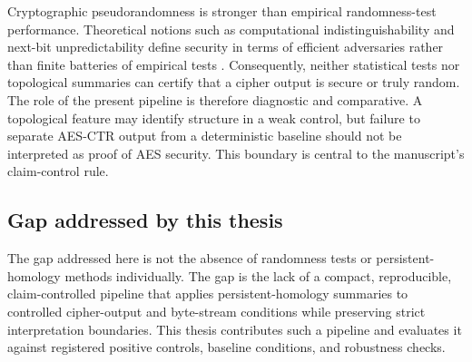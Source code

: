 Cryptographic pseudorandomness is stronger than empirical randomness-test performance. Theoretical notions such as computational indistinguishability and next-bit unpredictability define security in terms of efficient adversaries rather than finite batteries of empirical tests \citep{yao1982theory}. Consequently, neither statistical tests nor topological summaries can certify that a cipher output is secure or truly random. The role of the present pipeline is therefore diagnostic and comparative. A topological feature may identify structure in a weak control, but failure to separate AES-CTR output from a deterministic baseline should not be interpreted as proof of AES security. This boundary is central to the manuscript's claim-control rule.

\subsection{Gap addressed by this thesis}
\label{subsec:related-gap}

The gap addressed here is not the absence of randomness tests or persistent-homology methods individually. The gap is the lack of a compact, reproducible, claim-controlled pipeline that applies persistent-homology summaries to controlled cipher-output and byte-stream conditions while preserving strict interpretation boundaries. This thesis contributes such a pipeline and evaluates it against registered positive controls, baseline conditions, and robustness checks.
